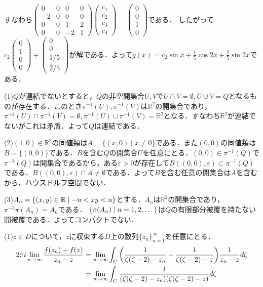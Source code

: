 \documentclass[
		book,
		head_space=20mm,
		foot_space=20mm,
		gutter=10mm,
		line_length=190mm
]{jlreq}
\begin{document}
	すなわち$\begin{pmatrix}
		0 & 0 & 0 & 0\\
		-2 & 0 & 0 & 0\\
		0 & 0 & 1 & 2\\
		0 & 0 & -2 & 1
	\end{pmatrix}\begin{pmatrix}
	c_1\\
	c_2\\
	c_3\\
	c_4
\end{pmatrix}=\begin{pmatrix}
	0\\
	0\\
	1\\
	0
	\end{pmatrix}$である．
	したがって$c_2 \begin{pmatrix}
		0\\
		1\\
		0\\
		0
	\end{pmatrix}+\begin{pmatrix}
		0\\
		0\\
		1/5 \\
		2/5
	\end{pmatrix}$が解である．よって$g(x)=c_2\sin x+\frac{1}{5}\cos 2x+\frac{2}{5}\sin 2x$である．

	(1)$Q$が連結でないとすると，$Q$の非空開集合$U,V$で$U\cap V=\emptyset,U\cup V=Q$となるものが存在する．このとき$\pi^{-1}(U),\pi^{-1}(V)$は$\mathbb{R}^2$の開集合であり，$\pi^{-1}(U)\cap \pi^{-1}(V)=\emptyset,\pi^{-1}(U)\cup \pi^{-1}(V)=\mathbb{R}^2$となる．すなわち$\mathbb{R}^2$が連結でないがこれは矛盾．よって$Q$は連結である．

	(2)$(1,0)\in \mathbb{R}^2$の同値類は$A=\{ (x,0)\mid x\neq 0\}$である．また$(0,0)$の同値類は$B=\{(0,0)\}$である．$B$を含む$Q$の開集合$U $を任意にとる．$(0,0)\in \pi^{-1}(Q)$で$\pi^{-1}(Q)$は開集合であるから，ある$\varepsilon>0$が存在して$B((0,0),\varepsilon)\subset \pi^{-1}(Q)$である．$B((0,0),\varepsilon)\cap A\neq \emptyset$である．よって$B$を含む任意の開集合は$A$を含むから，ハウスドルフ空間でない．

	(3)$A_n=\qty{ (x,y)\in \mathbb{R} \mathrel{}\middle|\mathrel{}  -n<xy<n}$とする．$A_n$は$\mathbb{R}^2$の開集合であり，$\pi^{-1}\pi(A_n)=A_n$である．
	$\qty{\pi(A_n)\mathrel{}\middle|\mathrel{} n =1,2,\dots}$は$Q$の有限部分被覆を持たない開被覆である．よってコンパクトでない．

(1)$z\in D$について，$z$に収束する$D$上の数列$\{z_n\}_{n=1}^\infty$を任意にとる．
\begin{align}
	2\pi i\lim\limits_{n\to \infty}\frac{f(z_n)-f(z)}{z_n-z}&=\lim\limits_{n\to \infty}\int_C \qty(\frac{1}{\zeta(\zeta-2)-z_n}-\frac{1}{\zeta(\zeta-2)-z})\frac{1}{z_n-z}d\zeta\\
	&=\lim\limits_{n\to \infty}\int_C \frac{1}{(\zeta(\zeta-2)-z_n)(\zeta(\zeta-2)-z)}d\zeta\\
\end{align}
\end{document}
